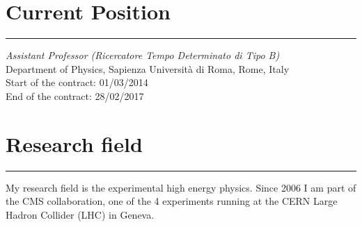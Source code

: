 \documentclass[10pt, a4paper]{article}
\begin{document}
\section*{Current Position}
\vspace{-5pt}
\hrule
\vspace{10pt}
\emph{Assistant Professor (Ricercatore Tempo Determinato di Tipo B)} \\
Department of Physics, Sapienza Universit\`a di Roma, Rome, Italy \\ [1em]
Start of the contract: 01/03/2014 \\
End of the contract: 28/02/2017 


\section*{Research field}
\vspace{-5pt}
\hrule
\vspace{10pt}
My research field is the experimental high energy physics. Since 2006
I am part of the CMS collaboration, one of the 4 experiments running at
the CERN Large Hadron Collider (LHC) in Geneva.
\end{document}

